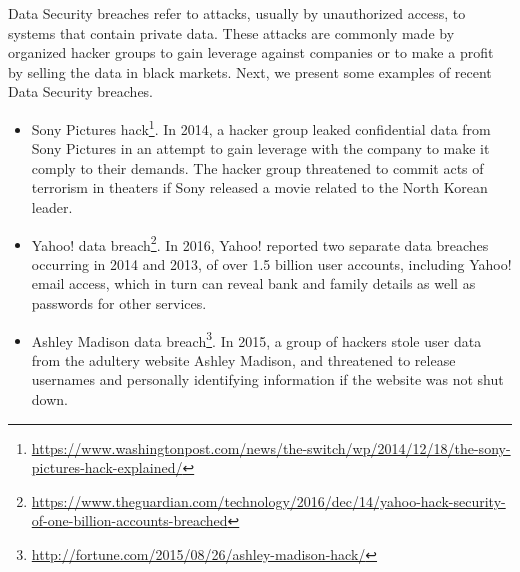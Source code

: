 Data Security breaches refer to attacks, usually by unauthorized access, to systems that contain private data. These attacks are commonly made by organized hacker groups to gain leverage against companies or to make a profit by selling the data in black markets. Next, we present some examples of recent Data Security breaches.
\begin{itemize}

    \item Sony Pictures hack\footnote{\url{https://www.washingtonpost.com/news/the-switch/wp/2014/12/18/the-sony-pictures-hack-explained/}}. In 2014, a hacker group leaked confidential data from Sony Pictures in an attempt to gain leverage with the company to make it comply to their demands. The hacker group threatened to commit acts of terrorism in theaters if Sony released a movie related to the North Korean leader.

    \item Yahoo! data breach\footnote{\url{https://www.theguardian.com/technology/2016/dec/14/yahoo-hack-security-of-one-billion-accounts-breached}}. In 2016, Yahoo! reported two separate data breaches occurring in 2014 and 2013, of over 1.5 billion user accounts, including Yahoo! email access, which in turn can reveal bank and family details as well as passwords for other services.

    \item Ashley Madison data breach\footnote{\url{http://fortune.com/2015/08/26/ashley-madison-hack/}}. In 2015, a group of hackers stole user data from the adultery website Ashley Madison, and threatened to release usernames and personally identifying information if the website was not shut down.


\end{itemize}




